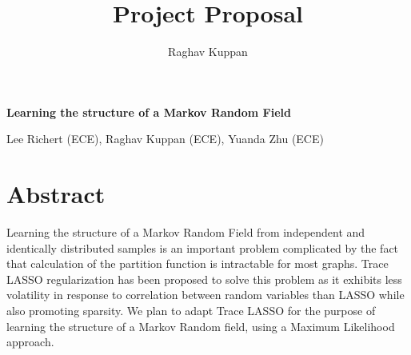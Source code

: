 \documentclass[11pt]{article}
\author{Raghav Kuppan}
\title{Project Proposal}
\begin{document}
\begin{center}
\textbf{\Large Learning the structure of a Markov Random Field}
\end{center}

\begin{center}
Lee Richert (ECE), Raghav Kuppan (ECE), Yuanda Zhu (ECE)
\end{center}



\section{Abstract}
Learning the structure of a Markov Random Field from independent and identically distributed samples is an important problem complicated by the fact that calculation of the partition function is intractable for most graphs. Trace LASSO regularization has been proposed to solve this problem as it exhibits less volatility in response to correlation between random variables than LASSO while also promoting sparsity. We plan to adapt Trace LASSO for the purpose of learning the structure of a Markov Random field, using a Maximum Likelihood approach.
\end{document}
